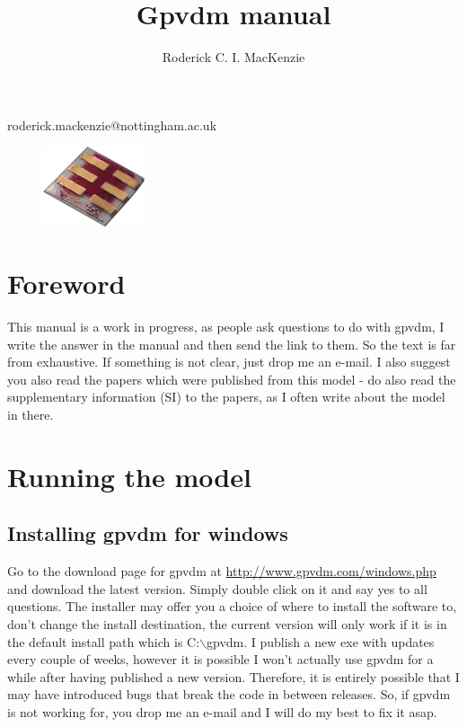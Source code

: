 \documentclass[11pt]{article}
\begin{document}
\title{Gpvdm manual}

\author{Roderick C. I. MacKenzie}


\maketitle




\centerline{roderick.mackenzie@nottingham.ac.uk}


\begin{figure}[ht!]
\centering
\includegraphics[width=30mm]{./images/cell.jpg}
\label{overflow}
\end{figure}

\newpage
\section{Foreword}
This manual is a work in progress, as people ask questions to do with gpvdm, I write the answer in the manual and then send the link to them.  So the text is far from exhaustive.  If something is not clear, just drop me an e-mail.  I also suggest you also read the papers which were published from this model - do also read the supplementary information (SI) to the papers, as I often write about the model in there.

\section{Running the model}

\subsection{Installing gpvdm for windows}
Go to the download page for gpvdm at \url{http://www.gpvdm.com/windows.php} and download the latest version.  Simply double click on it and say yes to all questions.  The installer may offer you a choice of where to install the software to, don't change the install destination, the current version will only work if it is in the default install path which is C:$\backslash$gpvdm.  I publish a new exe with updates every couple of weeks, however it is possible I won't actually use gpvdm for a while after having published a new version.  Therefore, it is entirely possible that I may have introduced bugs that break the code in between releases.  So, if gpvdm is not working for, you drop me an e-mail and I will do my best to fix it asap.
\end{document}

